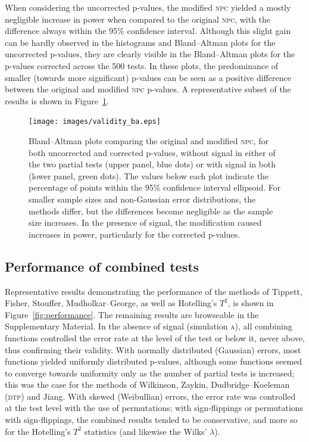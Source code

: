 When considering the uncorrected p-values, the modified \textsc{npc} yielded a mostly negligible increase in power when compared to the original \textsc{npc}, with the difference always within the 95\% confidence interval. Although this slight gain can be hardly observed in the histograms and Bland--Altman plots for the uncorrected p-values, they are clearly visible in the Bland--Altman plots for the p-values corrected across the 500 tests. In these plots, the predominance of smaller (towards more significant) p-values can be seen as a positive difference between the original and modified \textsc{npc} p-values. A representative subset of the results is shown in Figure~\ref{fig:validity_ba}.

\begin{figure}[p]
\begin{center}
\centerline{\texttt{[image: images/validity\_ba.eps]}}
\end{center}
\vspace{-3mm}
\caption[Bland--Altman plots comparing original and modified \textsc{npc}.]{Bland--Altman plots comparing the original and modified \textsc{npc}, for both uncorrected and corrected p-values, without signal in either of the two partial tests (upper panel, blue dots) or with signal in both (lower panel, green dots). The values below each plot indicate the percentage of points within the 95\% confidence interval ellipsoid. For smaller sample sizes and non-Gaussian error distributions, the methods differ, but the differences become negligible as the sample size increases. In the presence of signal, the modification caused increases in power, particularly for the corrected p-values.}
\label{fig:validity_ba}
\end{figure}

\subsection{Performance of combined tests}

Representative results demonstrating the performance of the methods of Tippett, Fisher, Stouffer, Mudholkar--George, as well as Hotelling's $T^2$, is shown in Figure~\ref{fig:performance}. The remaining results are browseable in the Supplementary Material. In the absence of signal (simulation \textsc{a}), all combining functions controlled the error rate at the level of the test or below it, never above, thus confirming their validity. With normally distributed (Gaussian) errors, most functions yielded uniformly distributed p-values, although some functions seemed to converge towards uniformity only as the number of partial tests is increased; this was the case for the methods of Wilkinson, Zaykin, Dudbridge--Koeleman (\textsc{dtp}) and Jiang. With skewed (Weibullian) errors, the error rate was controlled at the test level with the use of permutations; with sign-flippings or permutations with sign-flippings, the combined results tended to be conservative, and more so for the Hotelling's $T^2$ statistics (and likewise the Wilks' $\lambda$).

